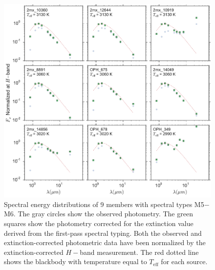 \begin{figure}[ht!]
  \caption{ Spectral energy distributions of 9 members with spectral types M5$-$M6.  The gray circles show the observed photometry.  The green squares show the photometry corrected for the extinction value derived from the first-pass spectral typing.  Both the observed and extinction-corrected photometric data have been normalized by the extinction-corrected $H-$band measurement.  The red dotted line shows the blackbody with temperature equal to $T_{\mathrm{eff}}$ for each source.  \label{fig_SEDs_9panel} }
\centering
\includegraphics[scale=0.6]{chIMACS/figures/SEDS_9panel}
\end{figure}

